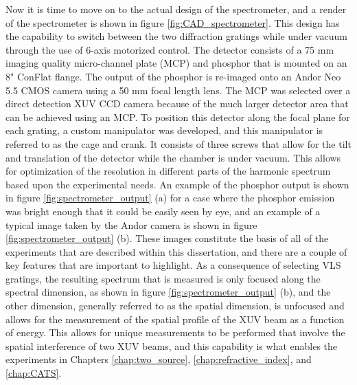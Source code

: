 Now it is time to move on to the actual design of the spectrometer, and a render of the spectrometer is shown in figure \ref{fig:CAD_spectrometer}. This design has the capability to switch between the two diffraction gratings while under vacuum through the use of 6-axis motorized control.  The detector consists of a 75 mm imaging quality micro-channel plate (MCP) and phosphor that is mounted on an 8" ConFlat flange.  The output of the phosphor is re-imaged onto an Andor Neo 5.5 CMOS camera using a 50 mm focal length lens.  The MCP was selected over a direct detection XUV CCD camera because of the much larger detector area that can be achieved using an MCP. To position this detector along the focal plane for each grating, a custom manipulator was developed, and this manipulator is referred to as the cage and crank.  It consists of three screws that allow for the tilt and translation of the detector while the chamber is under vacuum.  This allows for optimization of the resolution in different parts of the harmonic spectrum based upon the experimental needs.  An example of the phosphor output is shown in figure \ref{fig:spectrometer_output} (a) for a case where the phosphor emission was bright enough that it could be easily seen by eye, and an example of a typical image taken by the Andor camera is shown in figure \ref{fig:spectrometer_output} (b).  These images constitute the basis of all of the experiments that are described within this dissertation, and there are a couple of key features that are important to highlight.  As a consequence of selecting VLS gratings, the resulting spectrum that is measured is only focused along the spectral dimension, as shown in figure \ref{fig:spectrometer_output} (b), and the other dimension, generally referred to as the spatial dimension,  is unfocused and allows for the measurement of the spatial profile of the XUV beam as a function of energy.  This allows for unique measurements to be performed that involve the spatial interference of two XUV beams, and this capability is what enables the experiments in Chapters \ref{chap:two_source}, \ref{chap:refractive_index}, and  \ref{chap:CATS}.


